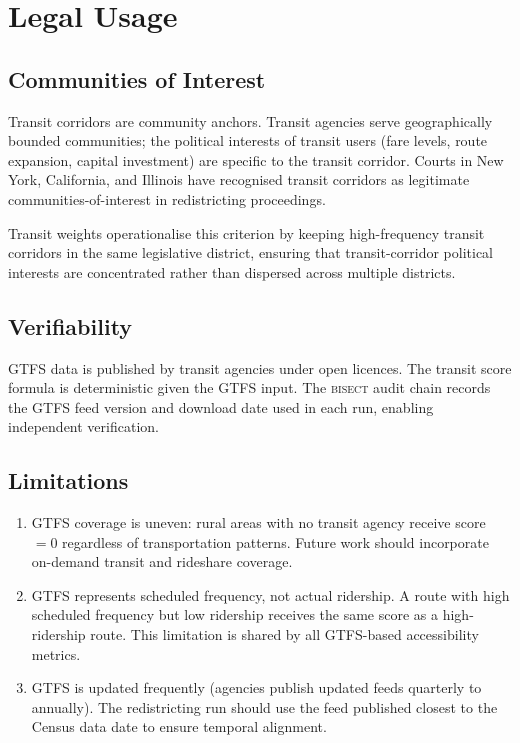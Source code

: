 \section{Legal Usage}

\subsection{Communities of Interest}

Transit corridors are community anchors. Transit agencies serve geographically bounded communities; the political interests of transit users (fare levels, route expansion, capital investment) are specific to the transit corridor. Courts in New York, California, and Illinois have recognised transit corridors as legitimate communities-of-interest in redistricting proceedings.

Transit weights operationalise this criterion by keeping high-frequency transit corridors in the same legislative district, ensuring that transit-corridor political interests are concentrated rather than dispersed across multiple districts.

\subsection{Verifiability}

GTFS data is published by transit agencies under open licences. The transit score formula is deterministic given the GTFS input. The \textsc{bisect} audit chain records the GTFS feed version and download date used in each run, enabling independent verification.

\subsection{Limitations}

\begin{enumerate}
  \item GTFS coverage is uneven: rural areas with no transit agency receive score $= 0$ regardless of transportation patterns. Future work should incorporate on-demand transit and rideshare coverage.
  \item GTFS represents scheduled frequency, not actual ridership. A route with high scheduled frequency but low ridership receives the same score as a high-ridership route. This limitation is shared by all GTFS-based accessibility metrics.
  \item GTFS is updated frequently (agencies publish updated feeds quarterly to annually). The redistricting run should use the feed published closest to the Census data date to ensure temporal alignment.
\end{enumerate}
